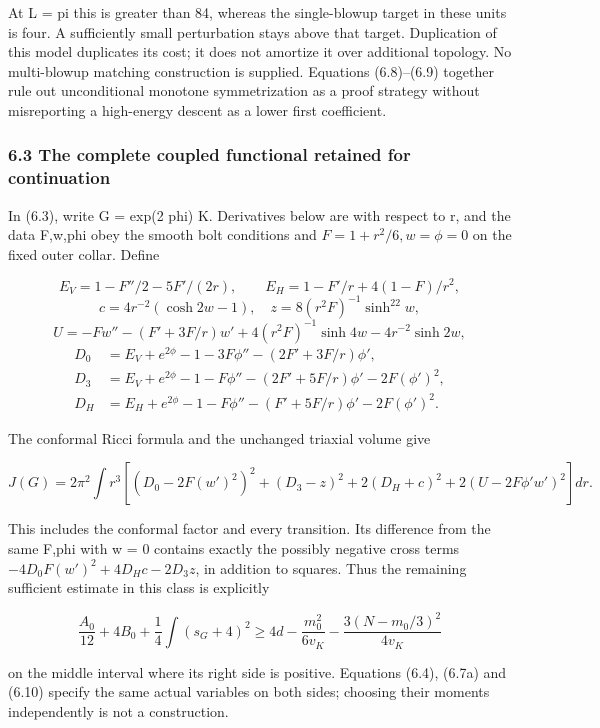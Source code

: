 \documentclass[
  10pt,
]{article}
\begin{document}
At L = pi this is greater than 84, whereas the single-blowup target in
these units is four. A sufficiently small perturbation stays above that
target. Duplication of this model duplicates its cost; it does not
amortize it over additional topology. No multi-blowup matching
construction is supplied. Equations (6.8)--(6.9) together rule out
unconditional monotone symmetrization as a proof strategy without
misreporting a high-energy descent as a lower first coefficient.

\hypertarget{the-complete-coupled-functional-retained-for-continuation}{%
\subsubsection{6.3 The complete coupled functional retained for
continuation}\label{the-complete-coupled-functional-retained-for-continuation}}

In (6.3), write G = exp(2 phi) K. Derivatives below are with respect to
r, and the data F,w,phi obey the smooth bolt conditions and
\(F=1+r^2/6,w=\phi=0\) on the fixed outer collar. Define

\[
 E_V=1-F''/2-5F'/(2r),\qquad
 E_H=1-F'/r+4(1-F)/r^2,
\] \[
 c=4r^{-2}(\cosh2w-1),\quad z=8(r^2F)^{-1}\sinh^22w,
\] \[
 U=-Fw''-(F'+3F/r)w'+4(r^2F)^{-1}\sinh4w
                                        -4r^{-2}\sinh2w,
\] \[
\begin{aligned}
 D_0&=E_V+e^{2\phi}-1-3F\phi''-(2F'+3F/r)\phi',\\
 D_3&=E_V+e^{2\phi}-1-F\phi''-(2F'+5F/r)\phi'-2F(\phi')^2,\\
 D_H&=E_H+e^{2\phi}-1-F\phi''-(F'+5F/r)\phi'-2F(\phi')^2.
\end{aligned}
\]

The conformal Ricci formula and the unchanged triaxial volume give

\[
 \boxed{J(G)=2\pi^2\int r^3\left[
 (D_0-2F(w')^2)^2+(D_3-z)^2+2(D_H+c)^2
                    +2(U-2F\phi'w')^2\right]dr.}         \tag{6.10}
\]

This includes the conformal factor and every transition. Its difference
from the same F,phi with w = 0 contains exactly the possibly negative
cross terms \(-4D_0F(w')^2+4D_Hc-2D_3z\), in addition to squares. Thus
the remaining sufficient estimate in this class is explicitly

\[
 \frac{A_0}{12}+4B_0+\frac14\int(s_G+4)^2
 \ge4d-\frac{m_0^2}{6v_K}
                 -\frac{3(N-m_0/3)^2}{4v_K}              \tag{6.11}
\]

on the middle interval where its right side is positive. Equations
(6.4), (6.7a) and (6.10) specify the same actual variables on both
sides; choosing their moments independently is not a construction.
\end{document}
